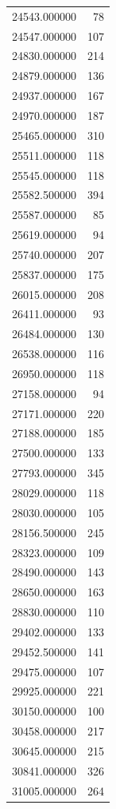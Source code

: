 \begin{tabular}{lr}
24543.000000  &    78 \\
24547.000000  &   107 \\
24830.000000  &   214 \\
24879.000000  &   136 \\
24937.000000  &   167 \\
24970.000000  &   187 \\
25465.000000  &   310 \\
25511.000000  &   118 \\
25545.000000  &   118 \\
25582.500000  &   394 \\
25587.000000  &    85 \\
25619.000000  &    94 \\
25740.000000  &   207 \\
25837.000000  &   175 \\
26015.000000  &   208 \\
26411.000000  &    93 \\
26484.000000  &   130 \\
26538.000000  &   116 \\
26950.000000  &   118 \\
27158.000000  &    94 \\
27171.000000  &   220 \\
27188.000000  &   185 \\
27500.000000  &   133 \\
27793.000000  &   345 \\
28029.000000  &   118 \\
28030.000000  &   105 \\
28156.500000  &   245 \\
28323.000000  &   109 \\
28490.000000  &   143 \\
28650.000000  &   163 \\
28830.000000  &   110 \\
29402.000000  &   133 \\
29452.500000  &   141 \\
29475.000000  &   107 \\
29925.000000  &   221 \\
30150.000000  &   100 \\
30458.000000  &   217 \\
30645.000000  &   215 \\
30841.000000  &   326 \\
31005.000000  &   264 \\

\end{tabular}
